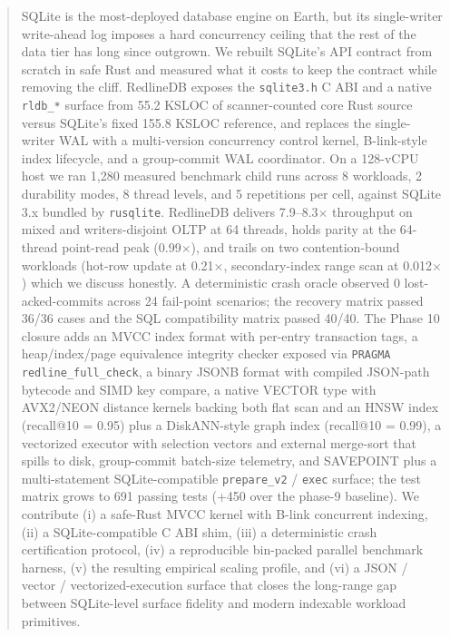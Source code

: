 \begin{abstract}
SQLite is the most-deployed database engine on Earth, but its
single-writer write-ahead log imposes a hard concurrency ceiling that
the rest of the data tier has long since outgrown. We rebuilt SQLite's
API contract from scratch in safe Rust and measured what it costs to
keep the contract while removing the cliff. %
RedlineDB exposes the
\texttt{sqlite3.h} C ABI and a native \texttt{rldb\_*} surface from
55.2 KSLOC of scanner-counted core Rust source versus SQLite's fixed
155.8 KSLOC reference, and replaces the
single-writer WAL with a multi-version concurrency control kernel,
B-link-style index lifecycle, and a group-commit WAL coordinator. On a
128-vCPU host we ran 1{,}280 measured benchmark child runs across
8 workloads, 2 durability modes, 8 thread levels, and 5 repetitions per
cell, against SQLite 3.x bundled by \texttt{rusqlite}. RedlineDB
delivers 7.9--8.3$\times$ throughput on mixed and writers-disjoint
OLTP at 64 threads, holds parity at the 64-thread point-read peak
(0.99$\times$), and trails on two contention-bound workloads
(hot-row update at 0.21$\times$, secondary-index range scan at
0.012$\times$) which we discuss honestly. A deterministic crash
oracle observed 0 lost-acked-commits across 24 fail-point scenarios;
the recovery matrix passed 36/36 cases and the SQL compatibility
matrix passed 40/40. The Phase 10 closure adds an MVCC index format
with per-entry transaction tags, a heap/index/page equivalence
integrity checker exposed via \texttt{PRAGMA redline\_full\_check}, a
binary JSONB format with compiled JSON-path bytecode and SIMD key
compare, a native VECTOR type with AVX2/NEON distance kernels backing
both flat scan and an HNSW index (recall@10 = 0.95) plus a DiskANN-style
graph index (recall@10 = 0.99), a vectorized executor with selection
vectors and external merge-sort that spills to disk, group-commit
batch-size telemetry, and SAVEPOINT plus a multi-statement
SQLite-compatible \texttt{prepare\_v2} / \texttt{exec} surface; the
test matrix grows to 691 passing tests (+450 over the phase-9
baseline). We contribute (i) a safe-Rust MVCC kernel with B-link
concurrent indexing, (ii) a SQLite-compatible C ABI shim, (iii)
a deterministic crash certification protocol, (iv) a reproducible
bin-packed parallel benchmark harness, (v) the resulting empirical
scaling profile, and (vi) a JSON / vector / vectorized-execution
surface that closes the long-range gap between SQLite-level surface
fidelity and modern indexable workload primitives.
\end{abstract}
